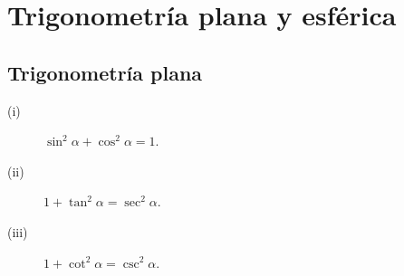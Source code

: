 \chapter{Trigonometría plana y esférica}
\section{Trigonometría plana}
\begin{ftheorem}[]
\normalfont 
\begin{description}
\item[(i)] $\displaystyle \sin ^{2}\alpha + \cos^{2}\alpha = 1 $.
\item[(ii)] $\displaystyle 1 + \tan ^{2}\alpha = \sec^{2}\alpha  $.
\item[(iii)] $\displaystyle 1 + \cot ^{2}\alpha = \csc^{2}\alpha  $.
\end{description}
\end{ftheorem}

